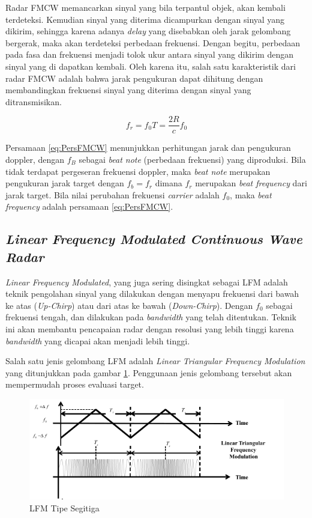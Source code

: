 Radar FMCW memancarkan sinyal yang bila terpantul objek, akan kembali terdeteksi. Kemudian sinyal yang diterima dicampurkan dengan sinyal yang dikirim, sehingga karena adanya \textit{delay} yang disebabkan oleh jarak gelombang bergerak, maka akan terdeteksi perbedaan frekuensi. Dengan begitu, perbedaan pada fasa dan frekuensi menjadi tolok ukur antara sinyal yang dikirim dengan sinyal yang di dapatkan kembali.
Oleh karena itu, salah satu karakteristik dari radar FMCW adalah bahwa jarak pengukuran dapat dihitung dengan membandingkan frekuensi sinyal yang diterima dengan sinyal yang ditransmisikan.   

\begin{equation} 
	f_{r} = f_{0} T = \frac{2R}{c} f_{0}
	\label{eq:PersFMCW}
\end{equation}

Persamaan \ref{eq:PersFMCW} menunjukkan perhitungan jarak dan pengukuran doppler, dengan $f_{B}$ sebagai \textit{beat note} (perbedaan frekuensi) yang diproduksi. Bila tidak terdapat pergeseran frekuensi doppler, maka \textit{beat note} merupakan pengukuran jarak target dengan $f_{b} = f_{r}$ dimana $f_{r}$ merupakan \textit{beat frequency} dari jarak target. Bila nilai perubahan frekuensi \textit{carrier} adalah $f_{0}$, maka \textit{beat frequency} adalah persamaan \ref{eq:PersFMCW}.

\subsection{\textit{Linear Frequency Modulated Continuous Wave Radar}}
\textit{Linear Frequency Modulated}, yang juga sering disingkat sebagai LFM adalah teknik pengolahan sinyal yang dilakukan dengan menyapu frekuensi dari bawah ke atas (\textit{Up-Chirp}) atau dari atas ke bawah (\textit{Down-Chirp}). Dengan $f_{0}$ sebagai frekuensi tengah, dan dilakukan pada \textit{bandwidth} yang telah ditentukan. Teknik ini akan membantu pencapaian radar dengan resolusi yang lebih tinggi karena \textit{bandwidth} yang dicapai akan menjadi lebih tinggi.

Salah satu jenis gelombang LFM adalah \textit{Linear Triangular Frequency Modulation} yang ditunjukkan pada gambar \ref{pic:LFMTriangular}. Penggunaan jenis gelombang tersebut akan mempermudah proses evaluasi target.

\begin{figure}
	\begin{center}
		\includegraphics[scale=0.7]{pics/bab2/lfmTriangular.png}
		\caption[LFM Tipe Segitiga]{LFM Tipe Segitiga \cite{Jankiraman2018}}
		\label{pic:LFMTriangular}
	\end{center}
\end{figure}

